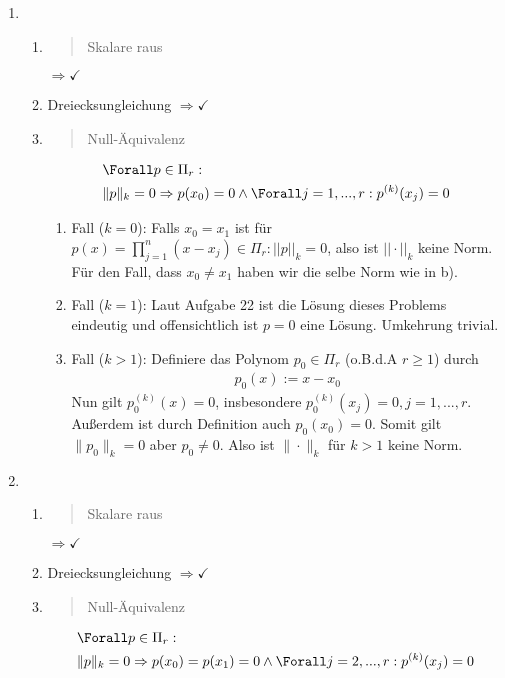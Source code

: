 \begin{solution}
\begin{enumerate}[label = \textbf{\alph*)}]
  \item
  \begin{enumerate}[label = \textit{\roman*)}]
    \item \blockquote{Skalare raus} $\Rightarrow \checkmark$
    \item Dreiecksungleichung $\Rightarrow \checkmark$
    \item \blockquote{Null-Äquivalenz} \begin{align*}
      &\Forall p \in \Pi_r: \\
      & \|p\|_k = 0 \Rightarrow p(x_0) = 0 \land \Forall j=1,...,r: p^{(k)}(x_j) = 0
    \end{align*}
    \begin{enumerate}[label = \textit{\arabic*.}]
      \item Fall ($k = 0$):
      Falls $x_0 = x_1$ ist für $p(x) = \prod_{j=1}^n (x - x_j) \in \Pi_r: ||p||_k = 0$,
      also ist $||\cdot||_k$ keine Norm. \\
      Für den Fall, dass $x_0 \neq x_1$ haben wir die selbe Norm wie in b).
      \item Fall ($k=1$):
      Laut Aufgabe 22 ist die Lösung dieses Problems eindeutig und offensichtlich ist $p = 0$ eine Lösung.
      Umkehrung trivial.
      \item Fall ($k>1$):
      Definiere das Polynom $p_0 \in \Pi_r$ (o.B.d.A $r \geq 1$) durch
      \begin{align*}
        p_0(x) := x-x_0
      \end{align*}
      Nun gilt $p_0^{(k)}(x) = 0$, insbesondere $p_0^{(k)}(x_j) = 0, j=1,...,r$. Außerdem ist durch Definition auch $p_0(x_0) = 0$.
      Somit gilt $\|p_0\|_k = 0$ aber $p_0 \neq 0$. Also ist $\|\cdot\|_k$ für $k>1$ keine Norm.
    \end{enumerate}
  \end{enumerate}
  \item
  \begin{enumerate}[label = \textit{\roman*)}]
    \item \blockquote{Skalare raus} $\Rightarrow \checkmark$
    \item Dreiecksungleichung $\Rightarrow \checkmark$
    \item \blockquote{Null-Äquivalenz} \begin{align*}
      &\Forall p \in \Pi_r: \\
      & \|p\|_k = 0 \Rightarrow p(x_0) = p(x_1) = 0 \land \Forall j=2,...,r: p^{(k)}(x_j) = 0
    \end{align*}
    \begin{enumerate}[label = \textit{\arabic*.}]

\end{enumerate}
\end{enumerate}
\end{enumerate}
\end{solution}
